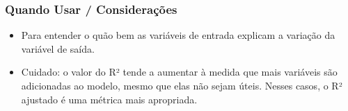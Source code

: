 \subsubsection*{Quando Usar / Considerações}
\begin{itemize}
    \item Para entender o quão bem as variáveis de entrada explicam a variação da variável de saída.
    \item Cuidado: o valor do R² tende a aumentar à medida que mais variáveis são adicionadas ao modelo, mesmo que elas não sejam úteis. Nesses casos, o R² ajustado é uma métrica mais apropriada.
\end{itemize}